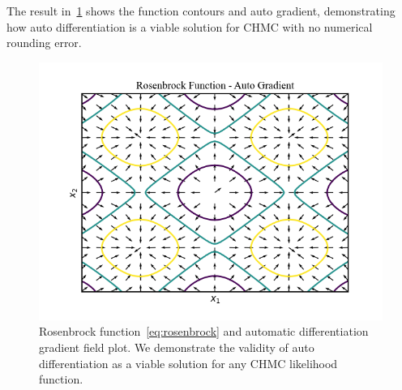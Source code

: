 \documentclass[11pt]{article}
\begin{document}
    The result in~\cref{fig:rosenbrock} shows the function contours and auto gradient, demonstrating how auto
    differentiation is a viable solution for CHMC with no numerical rounding error.
    \begin{figure}[h!]
        \center
        \includegraphics[width=\linewidth]{../figures/RosenbrockAutodiff}
        \caption{
            Rosenbrock function~\eqref{eq:rosenbrock} and automatic differentiation gradient field plot.
            We demonstrate the validity of auto differentiation as a viable solution for any CHMC likelihood function.
        }\label{fig:rosenbrock}
    \end{figure}
\end{document}
